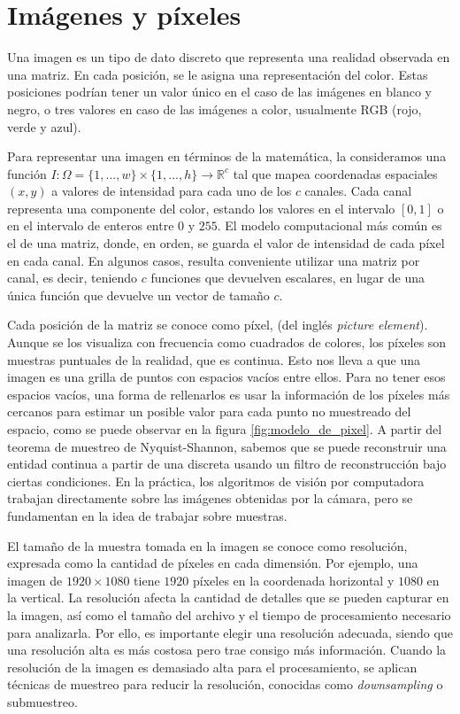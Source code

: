 \section{Imágenes y píxeles}

 Una imagen es un tipo de dato discreto que representa una realidad observada en una matriz. En cada posición, se le asigna una representación del color. Estas posiciones podrían tener un valor único en el caso de las imágenes en blanco y negro, o tres valores en caso de las imágenes a color, usualmente RGB (rojo, verde y azul).

Para representar una imagen en términos de la matemática, la consideramos una función $I : \Omega = \{1,...,w\} \times \{1,...,h\} \to \mathbb{R}^c$ tal que mapea coordenadas espaciales $(x,y)$ a valores de intensidad para cada uno de los $c$ canales. Cada canal representa una componente del color, estando los valores en el intervalo $[0,1]$ o en el intervalo de enteros entre $0$ y $255$. El modelo computacional más común es el de una matriz, donde, en orden, se guarda el valor de intensidad de cada píxel en cada canal. En algunos casos, resulta conveniente utilizar una matriz por canal, es decir, teniendo $c$ funciones que devuelven escalares, en lugar de una única función que devuelve un vector de tamaño $c$.

Cada posición de la matriz se conoce como píxel, (del inglés \textit{picture element}). Aunque se los visualiza con frecuencia como cuadrados de colores, los píxeles son muestras puntuales de la realidad, que es continua. Esto nos lleva a que una imagen es una grilla de puntos con espacios vacíos entre ellos. Para no tener esos espacios vacíos, una forma de rellenarlos es usar la información de los píxeles más cercanos para estimar un posible valor para cada punto no muestreado del espacio, como se puede observar en la figura \ref{fig:modelo_de_pixel}. A partir del teorema de muestreo de Nyquist-Shannon, sabemos que se puede reconstruir una entidad continua a partir de una discreta usando un filtro de reconstrucción \cite{SmithPixel} bajo ciertas condiciones. En la práctica, los algoritmos de visión por computadora trabajan directamente sobre las imágenes obtenidas por la cámara, pero se fundamentan en la idea de trabajar sobre muestras.

El tamaño de la muestra tomada en la imagen se conoce como resolución, expresada como la cantidad de píxeles en cada dimensión. Por ejemplo, una imagen de $1920 \times 1080$ tiene $1920$ píxeles en la coordenada horizontal y $1080$ en la vertical. La resolución afecta la cantidad de detalles que se pueden capturar en la imagen, así como el tamaño del archivo y el tiempo de procesamiento necesario para analizarla. Por ello, es importante elegir una resolución adecuada, siendo que una resolución alta es más costosa pero trae consigo más información. Cuando la resolución de la imagen es demasiado alta para el procesamiento, se aplican técnicas de muestreo para reducir la resolución, conocidas como \textit{downsampling} o submuestreo.

